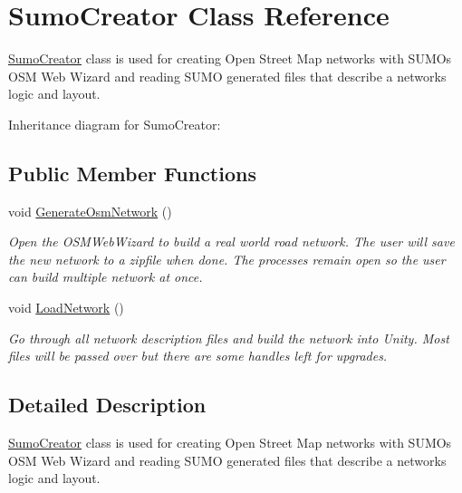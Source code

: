 \hypertarget{class_sumo_creator}{}\section{Sumo\+Creator Class Reference}
\label{class_sumo_creator}


\mbox{\hyperlink{class_sumo_creator}{Sumo\+Creator}} class is used for creating Open Street Map networks with S\+U\+MO\textquotesingle{}s O\+SM Web Wizard and reading S\+U\+MO generated files that describe a networks logic and layout.  


Inheritance diagram for Sumo\+Creator\+:\begin{figure}[H]
\begin{center}
\leavevmode
\end{center}
\end{figure}
\subsection*{Public Member Functions}
\begin{DoxyCompactItemize}
\item 
void \mbox{\hyperlink{class_sumo_creator_aa1e8e70d55f358f0a1af525056627b50}{Generate\+Osm\+Network}} ()
\begin{DoxyCompactList}\small\item\em Open the O\+S\+M\+Web\+Wizard to build a real world road network. The user will save the new network to a zipfile when done. The processes remain open so the user can build multiple network at once. \end{DoxyCompactList}\item 
void \mbox{\hyperlink{class_sumo_creator_a6fd91bdf15a05d7fc2b27b9e56a07042}{Load\+Network}} ()
\begin{DoxyCompactList}\small\item\em Go through all network description files and build the network into Unity. Most files will be passed over but there are some handles left for upgrades. \end{DoxyCompactList}\end{DoxyCompactItemize}


\subsection{Detailed Description}
\mbox{\hyperlink{class_sumo_creator}{Sumo\+Creator}} class is used for creating Open Street Map networks with S\+U\+MO\textquotesingle{}s O\+SM Web Wizard and reading S\+U\+MO generated files that describe a networks logic and layout. 



